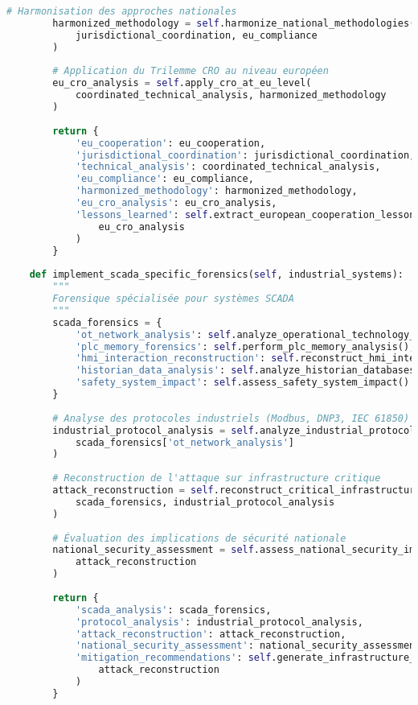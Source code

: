 \begin{lstlisting}[language=Python, caption=Investigation transfrontalière européenne]
        # Harmonisation des approches nationales
        harmonized_methodology = self.harmonize_national_methodologies(
            jurisdictional_coordination, eu_compliance
        )
        
        # Application du Trilemme CRO au niveau européen
        eu_cro_analysis = self.apply_cro_at_eu_level(
            coordinated_technical_analysis, harmonized_methodology
        )
        
        return {
            'eu_cooperation': eu_cooperation,
            'jurisdictional_coordination': jurisdictional_coordination,
            'technical_analysis': coordinated_technical_analysis,
            'eu_compliance': eu_compliance,
            'harmonized_methodology': harmonized_methodology,
            'eu_cro_analysis': eu_cro_analysis,
            'lessons_learned': self.extract_european_cooperation_lessons(
                eu_cro_analysis
            )
        }
    
    def implement_scada_specific_forensics(self, industrial_systems):
        """
        Forensique spécialisée pour systèmes SCADA
        """
        scada_forensics = {
            'ot_network_analysis': self.analyze_operational_technology_networks(),
            'plc_memory_forensics': self.perform_plc_memory_analysis(),
            'hmi_interaction_reconstruction': self.reconstruct_hmi_interactions(),
            'historian_data_analysis': self.analyze_historian_databases(),
            'safety_system_impact': self.assess_safety_system_impact()
        }
        
        # Analyse des protocoles industriels (Modbus, DNP3, IEC 61850)
        industrial_protocol_analysis = self.analyze_industrial_protocols(
            scada_forensics['ot_network_analysis']
        )
        
        # Reconstruction de l'attaque sur infrastructure critique
        attack_reconstruction = self.reconstruct_critical_infrastructure_attack(
            scada_forensics, industrial_protocol_analysis
        )
        
        # Évaluation des implications de sécurité nationale
        national_security_assessment = self.assess_national_security_implications(
            attack_reconstruction
        )
        
        return {
            'scada_analysis': scada_forensics,
            'protocol_analysis': industrial_protocol_analysis,
            'attack_reconstruction': attack_reconstruction,
            'national_security_assessment': national_security_assessment,
            'mitigation_recommendations': self.generate_infrastructure_mitigation_recommendations(
                attack_reconstruction
            )
        }
\end{lstlisting}


